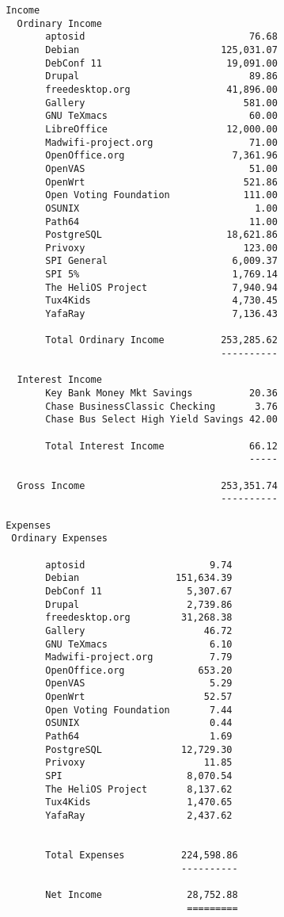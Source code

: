 \documentclass[letterpaper]{report}
\begin{document}
\begin{verbatim}
 Income
   Ordinary Income
        aptosid                             76.68
        Debian                         125,031.07
        DebConf 11                      19,091.00
        Drupal                              89.86
        freedesktop.org                 41,896.00
        Gallery                            581.00
        GNU TeXmacs                         60.00
        LibreOffice                     12,000.00
        Madwifi-project.org                 71.00
        OpenOffice.org                   7,361.96
        OpenVAS                             51.00
        OpenWrt                            521.86
        Open Voting Foundation             111.00
        OSUNIX                               1.00
        Path64                              11.00
        PostgreSQL                      18,621.86
        Privoxy                            123.00
        SPI General                      6,009.37
        SPI 5%                           1,769.14
        The HeliOS Project               7,940.94
        Tux4Kids                         4,730.45
        YafaRay                          7,136.43

        Total Ordinary Income          253,285.62
                                       ----------

   Interest Income
        Key Bank Money Mkt Savings          20.36
        Chase BusinessClassic Checking       3.76
        Chase Bus Select High Yield Savings 42.00

        Total Interest Income               66.12
                                            -----

   Gross Income                        253,351.74
                                       ----------

 Expenses
  Ordinary Expenses

        aptosid                      9.74
        Debian                 151,634.39
        DebConf 11               5,307.67
        Drupal                   2,739.86
        freedesktop.org         31,268.38
        Gallery                     46.72
        GNU TeXmacs                  6.10
        Madwifi-project.org          7.79
        OpenOffice.org             653.20
        OpenVAS                      5.29
        OpenWrt                     52.57
        Open Voting Foundation       7.44
        OSUNIX                       0.44
        Path64                       1.69
        PostgreSQL              12,729.30
        Privoxy                     11.85
        SPI                      8,070.54
        The HeliOS Project       8,137.62
        Tux4Kids                 1,470.65
        YafaRay                  2,437.62


        Total Expenses          224,598.86
                                ----------

        Net Income               28,752.88
                                 =========
\end{verbatim}
\end{document}

